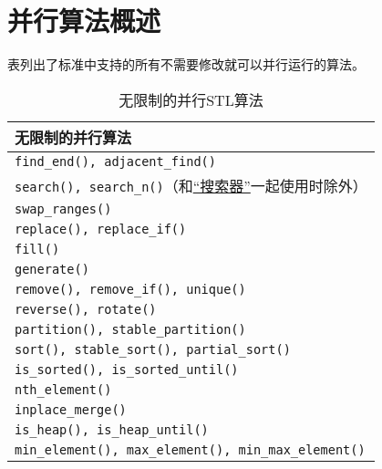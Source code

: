 \section{并行算法概述}
表列出了标准中支持的所有不需要修改就可以并行运行的算法。
\begin{table}[ht]
    \centering
    \begin{tabular}{l}
        \hline
        \textbf{无限制的并行算法}                                              \\
        \hline
        \texttt{find\_end(), adjacent\_find()}                         \\
        \texttt{search(), search\_n()}（和\hyperref[ch24]{“搜索器”}一起使用时除外） \\
        \texttt{swap\_ranges()}                                        \\
        \texttt{replace(), replace\_if()}                              \\
        \texttt{fill()}                                                \\
        \texttt{generate()}                                            \\
        \texttt{remove(), remove\_if(), unique()}                      \\
        \texttt{reverse(), rotate()}                                   \\
        \texttt{partition(), stable\_partition()}                      \\
        \texttt{sort(), stable\_sort(), partial\_sort()}               \\
        \texttt{is\_sorted(), is\_sorted\_until()}                     \\
        \texttt{nth\_element()}                                        \\
        \texttt{inplace\_merge()}                                      \\
        \texttt{is\_heap(), is\_heap\_until()}                         \\
        \texttt{min\_element(), max\_element(), min\_max\_element()}   \\
        \hline
    \end{tabular}
    \caption{无限制的并行STL算法}
    \label{t22.2}
\end{table}

